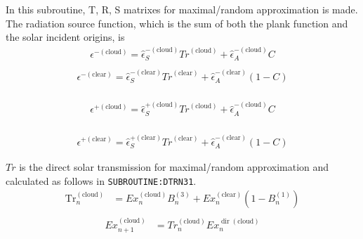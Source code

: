 In this subroutine, T, R, S matrixes for maximal/random approximation is
made. The radiation source function, which is the sum of both the plank
function and the solar incident origins, is \begin{equation}
\begin{array}{l}
\epsilon^{-(\text {cloud})}=\hat{\epsilon}_{S}^{-(\text {cloud})} {Tr}^{(\text {cloud})}+\hat{\epsilon}_{A}^{-(\text {cloud})} C \\
\end{array}
\end{equation} \begin{equation}
\begin{array}{l}
\epsilon^{-(\text {clear})}=\hat{\epsilon}_{S}^{-(\text {clear})}{Tr}^{(\text {clear})}+\hat{\epsilon}_{A}^{-(\text {clear})}(1-C) \\
\end{array}
\end{equation}

\begin{equation}
\begin{array}{l}
\epsilon^{+(\text {cloud})}=\hat{\epsilon}_{S}^{+(\text {cloud})}{Tr}^{(\text {cloud})}+\hat{\epsilon}_{A}^{-(\text {cloud})} C \\
\end{array}
\end{equation}

\begin{equation}
\begin{array}{l}
\epsilon^{+(\text {clear})}=\hat{\epsilon}_{S}^{+(\text {clear})}{Tr}^{(\text {clear})}+\hat{\epsilon}_{A}^{-(\text {clear})}(1-C)
\end{array}
\end{equation}

\(Tr\) is the direct solar transmission for maximal/random approximation
and calculated as follows in \texttt{SUBROUTINE:DTRN31}. \begin{equation}
\begin{aligned}
\operatorname{Tr}_{n}^{(\text {cloud})} &=E x_{n}^{(\text {cloud})} B_{n}^{(3)}+E x_{n}^{(\text {clear})}\left(1-B_{n}^{(1)}\right) \\
\end{aligned}
\end{equation} \begin{equation}
\begin{aligned}
E x_{n+1}^{(\text {cloud})} &={Tr}_{n}^{(\text {cloud})} E x_{n}^{\operatorname{dir}(\text {cloud})} \\
\end{aligned}
\end{equation}

